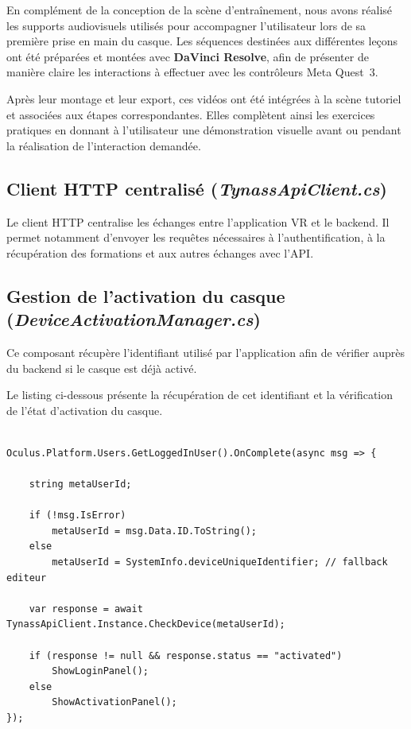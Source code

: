 En complément de la conception de la scène d'entraînement, nous avons réalisé les supports
audiovisuels utilisés pour accompagner l'utilisateur lors de sa première prise en main
du casque. Les séquences destinées aux différentes leçons ont été préparées et montées
avec \textbf{DaVinci Resolve}, afin de présenter de manière claire les interactions à
effectuer avec les contrôleurs Meta Quest~3.

Après leur montage et leur export, ces vidéos ont été intégrées à la scène tutoriel et associées aux étapes correspondantes. Elles complètent ainsi
les exercices pratiques en donnant à l'utilisateur une démonstration visuelle avant ou
pendant la réalisation de l'interaction demandée.

\subsection{Client HTTP centralisé (\textit{TynassApiClient.cs})}

Le client HTTP centralise les échanges entre l'application VR et le backend.
Il permet notamment d'envoyer les requêtes nécessaires à l'authentification,
à la récupération des formations et aux autres échanges avec l'API.


\subsection{Gestion de l'activation du casque
(\textit{DeviceActivationManager.cs})}

Ce composant récupère l'identifiant utilisé par l'application afin de vérifier
auprès du backend si le casque est déjà activé.

Le listing ci-dessous présente la récupération de cet identifiant et la
vérification de l'état d'activation du casque.

\begin{lstlisting}[language={[Sharp]C},
caption={Récupération de l'identifiant et vérification de l'activation du casque}]

Oculus.Platform.Users.GetLoggedInUser().OnComplete(async msg => {

    string metaUserId;

    if (!msg.IsError)
        metaUserId = msg.Data.ID.ToString();
    else
        metaUserId = SystemInfo.deviceUniqueIdentifier; // fallback editeur

    var response = await TynassApiClient.Instance.CheckDevice(metaUserId);

    if (response != null && response.status == "activated")
        ShowLoginPanel();
    else
        ShowActivationPanel();
});

\end{lstlisting}

